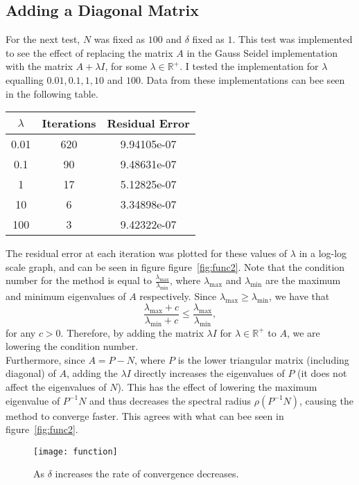 \documentclass[10pt]{article}
\begin{document}
\subsection{Adding a Diagonal Matrix}
For the next test, $N$ was fixed as $100$ and $\delta$ fixed as $1$. This test was implemented to see the effect of replacing the matrix $A$ in the Gauss Seidel implementation with the matrix $A+\lambda I$, for some $\lambda \in \mathbb{R}^+$. I tested the implementation for $\lambda$ equalling $0.01,0.1,1,10$ and $100$. Data from these implementations can bee seen in the following table.
\begin{center}
 \begin{tabular}{||c c c ||}
 \hline
 $\lambda$ & Iterations & Residual Error \\ [0.5ex]
 \hline\hline
 0.01 & 620 & 9.94105e-07  \\
 \hline
 0.1 & 90 & 9.48631e-07  \\
 \hline
 1 & 17 & 5.12825e-07 \\
 \hline
 10 & 6 & 3.34898e-07 \\
 \hline
 100 & 3 & 9.42322e-07 \\
 \hline
\end{tabular}
\end{center}

The residual error at each iteration was plotted for these values of $\lambda$ in a log-log scale graph, and can be seen in figure figure~\ref{fig:func2}. Note that the condition number for the method is equal to $\frac{\lambda_{\text{max}}}{\lambda_{\text{min}}}$, where $\lambda_\text{max}$ and $\lambda_\text{min}$ are the maximum and minimum eigenvalues of $A$ respectively. Since $\lambda_\text{max} \geq \lambda_\text{min}$, we have that
\[\frac{\lambda_{\text{max}}+c}{\lambda_{\text{min}}+c} \leq \frac{\lambda_{\text{max}}}{\lambda_{\text{min}}},\]
for any $c>0$. Therefore, by adding the matrix $\lambda I$ for $\lambda \in \mathbb{R}^+$ to $A$, we are lowering the condition number. \\

Furthermore, since $A = P - N$, where $P$ is the lower triangular matrix (including diagonal) of $A$, adding the $\lambda I$ directly increases the eigenvalues of $P$ (it does not affect the eigenvalues of $N$). This has the effect of lowering the maximum eigenvalue of $P^{-1}N$ and thus decreases the spectral radius $\rho(P^{-1}N)$, causing the method to converge faster. This agrees with what can bee seen in figure~\ref{fig:func2}.

\clearpage

 \begin{figure}
 \begin{center}
    \texttt{[image: function]}
  \end{center}
  \caption{As $\delta$ increases the rate of convergence decreases.
  \label{fig:func_and_deriv}}
\end{figure}
\end{document}
